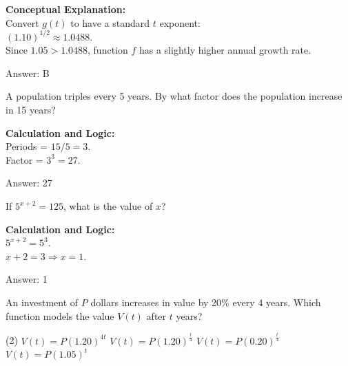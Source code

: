 \documentclass[11pt,paper=a4,answers]{exam}
\begin{document}
\begin{questions}
\begin{solution}
\textbf{Conceptual Explanation:} \\
Convert $g(t)$ to have a standard $t$ exponent: \\
$(1.10)^{1/2} \approx 1.0488$. \\
Since $1.05 > 1.0488$, function $f$ has a slightly higher annual growth rate.

\vspace{25pt}

Answer: \colorbox{yellow!100}{B}
\end{solution}

\vspace{40pt}

\question
A population triples every 5 years. By what factor does the population increase in 15 years?

\begin{solution}
\textbf{Calculation and Logic:} \\
Periods = $15 / 5 = 3$. \\
Factor = $3^3 = 27$.

\vspace{25pt}

Answer: \colorbox{yellow!100}{27}
\end{solution}

\vspace{40pt}

\question
If $5^{x+2} = 125$, what is the value of $x$?

\begin{solution}
\textbf{Calculation and Logic:} \\
$5^{x+2} = 5^3$. \\
$x + 2 = 3 \Rightarrow x = 1$.

\vspace{25pt}

Answer: \colorbox{yellow!100}{1}
\end{solution}

\vspace{40pt}

\question
An investment of $P$ dollars increases in value by 20\% every 4 years. Which function models the value $V(t)$ after $t$ years?
\begin{tasks}(2)
    \task $V(t) = P(1.20)^{4t}$
    \task $V(t) = P(1.20)^{\frac{t}{4}}$
    \task $V(t) = P(0.20)^{\frac{t}{4}}$
    \task $V(t) = P(1.05)^t$
\end{tasks}


\end{questions}
\end{document}
